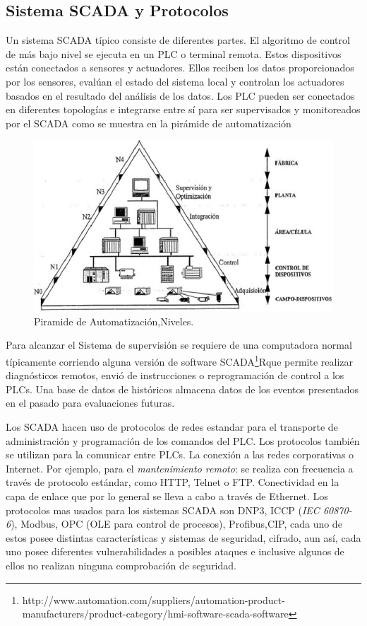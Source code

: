 \documentclass[jou,apacite]{apa6}
\begin{document}
\subsection{Sistema SCADA y Protocolos }
Un sistema SCADA típico consiste de diferentes partes. El algoritmo de control de más bajo nivel se ejecuta en un PLC o terminal remota. Estos dispositivos están conectados a sensores y actuadores. Ellos reciben los datos proporcionados por los sensores, evalúan el estado del sistema local  y controlan los actuadores basados en el resultado del análisis de los datos. Los PLC pueden ser conectados en diferentes topologías e integrarse entre sí para ser supervisados y monitoreados por el SCADA como se muestra en la pirámide de automatización 
\begin{figure}[htb]
\centering
\includegraphics[scale=0.4]{images/f3piramide.png}
\caption{Piramide de Automatización,Niveles.} \label{fig:piramide}
\end{figure}
Para alcanzar el Sistema de supervisión se requiere de una computadora normal típicamente corriendo alguna versión de software SCADA\footnote{http://www.automation.com/suppliers/automation-product-manufacturers/product-category/hmi-software-scada-software }Rque permite realizar diagnósticos remotos, envió de instrucciones o reprogramación de control a los PLCs. Una base de datos de históricos almacena datos de los eventos presentados  en el pasado para evaluaciones futuras\cite{TrendMicro}. 

Los SCADA hacen uso de protocolos de redes estandar para el transporte de administración y  programación de los comandos del PLC. Los protocolos también se utilizan para la comunicar entre PLCs. La conexión a las redes corporativas o Internet. Por ejemplo, para el \textit{mantenimiento remoto}: se realiza con frecuencia a través de protocolo estándar, como HTTP, Telnet o FTP. Conectividad en la capa de enlace que por lo general se lleva a cabo a través de Ethernet.
Los protocolos mas usados para los sistemas SCADA son DNP3, ICCP (\textit{IEC 60870-6}), Modbus, OPC (OLE para control de procesos), Profibus,CIP, cada uno de estos posee distintas características y sistemas de seguridad, cifrado, aun así, cada uno posee diferentes vulnerabilidades a posibles ataques e inclusive algunos de ellos no realizan ninguna comprobación de seguridad.
\end{document}
